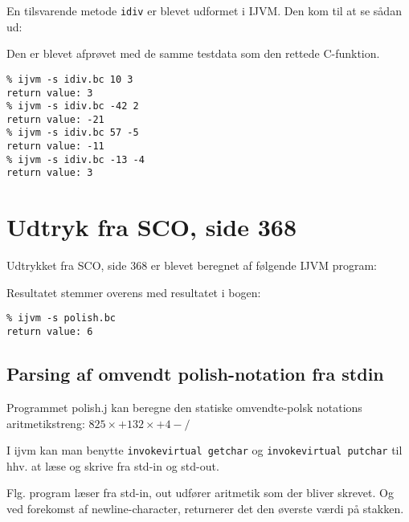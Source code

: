 \documentclass[12pt,a4paper]{article}
\begin{document}
\lstset{language=C}


En tilsvarende metode \texttt{idiv} er blevet udformet i IJVM. Den kom til at se sådan ud:

\lstset{language=JVMIS}


Den er blevet afprøvet med de samme testdata som den rettede C-funktion.

\lstset{language=sh}
\begin{lstlisting}
% ijvm -s idiv.bc 10 3
return value: 3
% ijvm -s idiv.bc -42 2
return value: -21
% ijvm -s idiv.bc 57 -5
return value: -11
% ijvm -s idiv.bc -13 -4
return value: 3
\end{lstlisting}

\section{Udtryk fra SCO, side 368}
Udtrykket fra SCO, side 368 er blevet beregnet af følgende IJVM program:

\lstset{language=JVMIS}


Resultatet stemmer overens med resultatet i bogen:
\lstset{language=sh}
\begin{lstlisting}
% ijvm -s polish.bc
return value: 6
\end{lstlisting}

\subsection{Parsing af omvendt polish-notation fra stdin}
Programmet polish.j kan beregne den statiske omvendte-polsk notations aritmetikstreng:
$825\times+132\times+4-/$

I ijvm kan man benytte \texttt{invokevirtual getchar} og \texttt{invokevirtual putchar} til hhv. at læse og skrive fra std-in og std-out.

Flg. program læser fra std-in, out udfører aritmetik som der bliver skrevet. Og ved forekomst af newline-character, returnerer det den øverste værdi på stakken.
\end{document}
